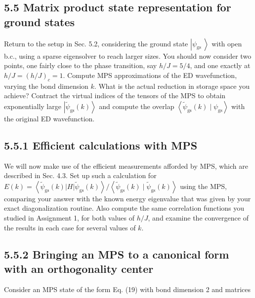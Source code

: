 \documentclass[12pt]{article}
\begin{document}
\subsection*{5.5 Matrix product state representation for ground states}
Return to the setup in Sec. 5.2, considering the ground state $\left|\psi_{\text {gs }}\right\rangle$ with open b.c., using a sparse eigensolver to reach larger sizes. You should now consider two points, one fairly close to the phase transition, say $h / J=5 / 4$, and one exactly at $h / J=(h / J)_{c}=1$. Compute MPS approximations of the ED wavefunction, varying the bond dimension $k$. What is the actual reduction in storage space you achieve? Contract the virtual indices of the tensors of the MPS to obtain exponentially large $\left|\tilde{\psi}_{\mathrm{gs}}(k)\right\rangle$ and compute the overlap $\left\langle\tilde{\psi}_{\mathrm{gs}}(k) \mid \psi_{\mathrm{gs}}\right\rangle$ with the original ED wavefunction.

\subsection*{5.5.1 Efficient calculations with MPS}
We will now make use of the efficient measurements afforded by MPS, which are described in Sec. 4.3. Set up such a calculation for $E(k)=\left\langle\tilde{\psi}_{\mathrm{gs}}(k)|H| \tilde{\psi}_{\mathrm{gs}}(k)\right\rangle /\left\langle\tilde{\psi}_{\mathrm{gs}}(k) \mid \tilde{\psi}_{\mathrm{gs}}(k)\right\rangle$ using the MPS, comparing your answer with the known energy eigenvalue that was given by your exact diagonalization routine. Also compute the same correlation functions you studied in Assignment 1, for both values of $h / J$, and examine the convergence of the results in each case for several values of $k$.

\subsection*{5.5.2 Bringing an MPS to a canonical form with an orthogonality center}
Consider an MPS state of the form Eq. (19) with bond dimension 2 and matrices
\end{document}
